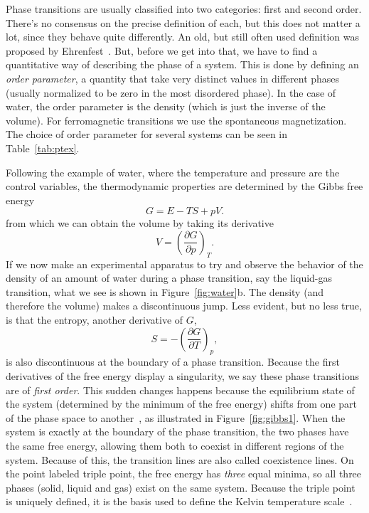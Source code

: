 Phase transitions are usually classified into two categories: first and second
order. There's no consensus on the precise definition of each, but this does
not matter a lot, since they behave quite differently. An old, but still often
used definition was proposed by Ehrenfest~\cite{Jaeger1998}. But, before we get
into that, we have to find a quantitative way of describing the phase of a
system. This is done by defining an \textit{order parameter}, a quantity that
take very distinct values in different phases (usually normalized to be zero in
the most disordered phase). In the case of water, the order parameter is the
density (which is just the inverse of the volume). For ferromagnetic
transitions we use the spontaneous magnetization. The choice of order parameter
for several systems can be seen in Table~\ref{tab:ptex}.



Following the example of water, where the temperature and pressure are the
control variables, the thermodynamic properties are determined by the Gibbs
free energy
\begin{equation}
    G=E-TS+pV.
\end{equation}
from which we can obtain the volume by taking its derivative
\begin{equation}
    V={\left(\frac{\partial G}{\partial p}\right)}_T.
\end{equation}
If we now make an experimental apparatus to try and observe the behavior of the
density of an amount of water during a phase transition, say the liquid-gas
transition, what we see is shown in Figure~\ref{fig:water}b. The density (and
therefore the volume) makes a discontinuous jump. Less evident, but no less
true, is that the entropy, another derivative of $G$,
\begin{equation}
    S=-{\left(\frac{\partial G}{\partial T}\right)}_p,
\end{equation}
is also discontinuous at the boundary of a phase transition. Because the first
derivatives of the free energy display a singularity, we say these phase
transitions are of \textit{first order}. This sudden changes happens because the
equilibrium state of the system (determined by the minimum of the free energy)
shifts from one part of the phase space to another~\cite{Callen1985}, as
illustrated in Figure~\ref{fig:gibbs1}. When the system is exactly at the
boundary of the phase transition, the two phases have the same free energy,
allowing them both to coexist in different regions of the system. Because of
this, the transition lines are also called coexistence lines. On the point
labeled triple point, the free energy has \textit{three} equal minima, so all
three phases (solid, liquid and gas) exist on the same system. Because the
triple point is uniquely defined, it is the basis used to define the Kelvin
temperature scale~\cite{Fermi1956}.

